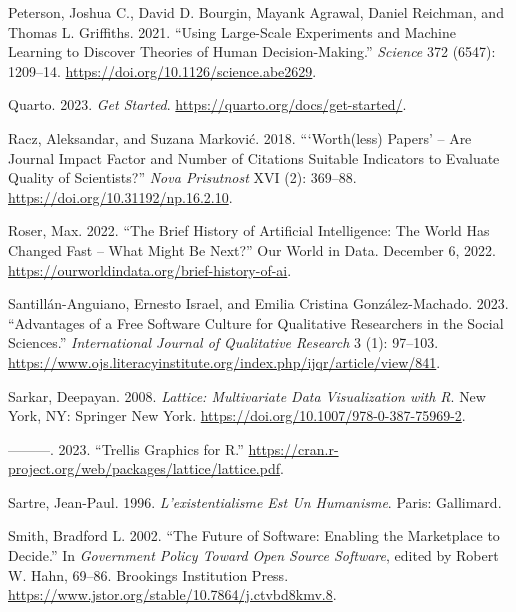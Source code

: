 \documentclass[
  letterpaper,
]{scrbook}
\newlength{\cslhangindent}
\newlength{\cslentryspacingunit} %
\newenvironment{CSLReferences}[2] %
 {%
  \setlength{\parindent}{0pt}
  \ifodd #1
  \let\oldpar\par
  \def\par{\hangindent=\cslhangindent\oldpar}
  \fi
  \setlength{\parskip}{#2\cslentryspacingunit}
 }%
 {}
\begin{document}
\begin{CSLReferences}{1}{0}
\leavevmode{}%
Peterson, Joshua C., David D. Bourgin, Mayank Agrawal, Daniel Reichman,
and Thomas L. Griffiths. 2021. {``Using {Large-Scale Experiments} and
{Machine Learning} to {Discover Theories} of {Human Decision-Making}.''}
\emph{Science} 372 (6547): 1209--14.
\url{https://doi.org/10.1126/science.abe2629}.

\leavevmode{}%
Quarto. 2023. \emph{Get {Started}}.
\url{https://quarto.org/docs/get-started/}.

\leavevmode{}%
Racz, Aleksandar, and Suzana Marković. 2018. {``{`{Worth}(less) Papers'}
-- Are Journal Impact Factor and Number of Citations Suitable Indicators
to Evaluate Quality of Scientists?''} \emph{Nova Prisutnost} XVI (2):
369--88. \url{https://doi.org/10.31192/np.16.2.10}.

\leavevmode{}%
Roser, Max. 2022. {``The {Brief History} of {Artificial Intelligence}:
{The World Has Changed Fast} -- {What Might Be Next}?''} {Our World in
Data}. December 6, 2022.
\url{https://ourworldindata.org/brief-history-of-ai}.

\leavevmode{}%
Santillán-Anguiano, Ernesto Israel, and Emilia Cristina
González-Machado. 2023. {``Advantages of a {Free Software Culture} for
{Qualitative Researchers} in the {Social Sciences}.''}
\emph{International Journal of Qualitative Research} 3 (1): 97--103.
\url{https://www.ojs.literacyinstitute.org/index.php/ijqr/article/view/841}.

\leavevmode{}%
Sarkar, Deepayan. 2008. \emph{Lattice: {Multivariate Data Visualization}
with {R}}. {New York, NY}: {Springer New York}.
\url{https://doi.org/10.1007/978-0-387-75969-2}.

\leavevmode{}%
---------. 2023. {``Trellis {Graphics} for {R}.''}
\url{https://cran.r-project.org/web/packages/lattice/lattice.pdf}.

\leavevmode{}%
Sartre, Jean-Paul. 1996. \emph{L'existentialisme Est Un Humanisme}.
{Paris}: {Gallimard}.

\leavevmode{}%
Smith, Bradford L. 2002. {``The {Future} of {Software}: {Enabling} the
{Marketplace} to {Decide}.''} In \emph{Government {Policy} Toward {Open
Source Software}}, edited by Robert W. Hahn, 69--86. {Brookings
Institution Press}.
\url{https://www.jstor.org/stable/10.7864/j.ctvbd8kmv.8}.


\end{CSLReferences}
\end{document}

